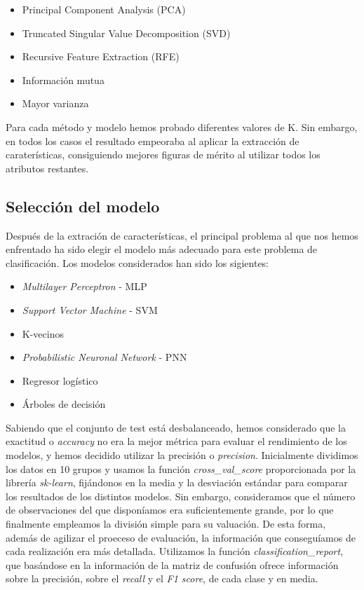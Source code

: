 \documentclass[journal,twoside]{JoPhA}
\begin{document}
\begin{itemize}
	\item Principal Component Analysis (PCA)
	\item Truncated Singular Value Decomposition (SVD)
	\item Recursive Feature Extraction (RFE)
	\item Información mutua
	\item Mayor varianza \\
\end{itemize}

Para cada método y modelo hemos probado diferentes valores de K. Sin embargo, en todos los casos el resultado empeoraba al aplicar la extracción de caraterísticas, consiguiendo mejores figuras de mérito al utilizar todos los atributos restantes. \\

\subsection{Selección del modelo}
Después de la extración de características, el principal problema al que nos hemos enfrentado ha sido elegir el modelo más adecuado para este problema de clasificación. Los modelos considerados han sido los sigientes: \\

\begin{itemize}
	\item \textit{Multilayer Perceptron} - MLP
	\item \textit{Support Vector Machine} - SVM
	\item K-vecinos
	\item \textit{Probabilistic Neuronal Network} - PNN
	\item Regresor logístico
	\item Árboles de decisión \\
\end{itemize} 

Sabiendo que el conjunto de test está desbalanceado, hemos considerado que la exactitud o \textit{accuracy} no era la mejor métrica para evaluar el rendimiento de los modelos, y hemos decidido utilizar la precisión o \textit{precision}. Inicialmente dividimos los datos en 10 grupos y usamos la función \textit{cross\_val\_score} proporcionada por la librería \emph{sk-learn}\cite{validacion_cruzada}, fijándonos en la media y la desviación estándar para comparar los resultados de los distintos modelos. Sin embargo, consideramos que el número de observaciones del que disponíamos era suficientemente grande, por lo que finalmente empleamos la división simple para su valuación. De esta forma, además de agilizar el proeceso de evaluación, la información que conseguíamos de cada realización era más detallada. Utilizamos la función \textit{classification\_report}, que basándose en la información de la matriz de confusión ofrece información sobre la precisión, sobre el \textit{recall} y el \textit{F1 score}, de cada clase y en media. \\
\end{document}
